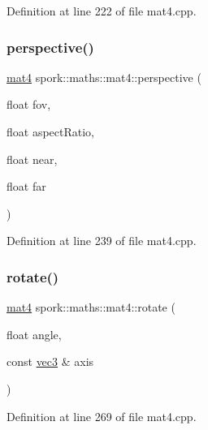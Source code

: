 Definition at line 222 of file mat4.\+cpp.

\mbox{\label{structspork_1_1maths_1_1mat4_afbbc5c7795b2a312c9aef93120695a6f}} 
\subsubsection{\texorpdfstring{perspective()}{perspective()}}
{\footnotesize\ttfamily \hyperlink{structspork_1_1maths_1_1mat4}{mat4} spork\+::maths\+::mat4\+::perspective (\begin{DoxyParamCaption}\item[{float}]{fov,  }\item[{float}]{aspect\+Ratio,  }\item[{float}]{near,  }\item[{float}]{far }\end{DoxyParamCaption})\hspace{0.3cm}{\ttfamily [static]}}



Definition at line 239 of file mat4.\+cpp.

\mbox{\label{structspork_1_1maths_1_1mat4_ab47cf3486703b158744c77b8273bcb5b}} 
\subsubsection{\texorpdfstring{rotate()}{rotate()}\hspace{0.1cm}{\footnotesize\ttfamily [1/2]}}
{\footnotesize\ttfamily \hyperlink{structspork_1_1maths_1_1mat4}{mat4} spork\+::maths\+::mat4\+::rotate (\begin{DoxyParamCaption}\item[{float}]{angle,  }\item[{const \hyperlink{structspork_1_1maths_1_1vec3}{vec3} \&}]{axis }\end{DoxyParamCaption})\hspace{0.3cm}{\ttfamily [static]}}



Definition at line 269 of file mat4.\+cpp.

